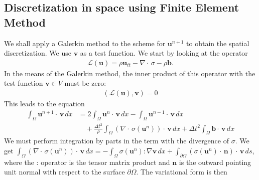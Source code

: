 \documentclass[twoside]{article}
\begin{document}
\subsection{Discretization in space using Finite Element Method}
\label{finiteelements}

We shall apply a Galerkin method to the scheme for \( \mathbf{u}^{n+1}\) to obtain the spatial discretization. We use \( \mathbf{v}\) as a test function. We start by looking at the operator 
\begin{align*}
	\mathcal{L}(\mathbf{u}) = \rho \mathbf{u}_{tt} - \nabla \cdot\, \sigma - \rho \mathbf{b}.
\end{align*}
In the means of the Galerkin method, the inner product of this operator with the test function \( \mathbf{v} \in V\) must be zero:
\begin{align}
	(\mathcal{L}(\mathbf{u}), \mathbf{v}) = 0
\end{align}
This leads to the equation
\begin{align*}
	\int_{\Omega} \mathbf{u}^{n+1} \cdot \, \mathbf{v} \, dx &= 2\int_{\Omega} \mathbf{u}^{n} \cdot \, \mathbf{v} \, dx - \int_{\Omega} \mathbf{u}^{n-1} \cdot \, \mathbf{v} \, dx \\
								  &\quad+ \frac{\Delta t^2}{\rho} \int_{\Omega} (\nabla \cdot \, \sigma(\mathbf{u}^{n})) \cdot \, \mathbf{v} \, dx + \Delta t^2 \int_{\Omega} \mathbf{b} \cdot \, \mathbf{v} \, dx 
\end{align*}
We must perform integration by parts in the term with the divergence of \( \sigma\). We get
\(\int_{\Omega} (\nabla \cdot \, \sigma(\mathbf{u}^{n})) \cdot \, \mathbf{v} \, dx 
	=  - \int_{\Omega} \sigma(\mathbf{u}^n) : \nabla \mathbf{v} \, dx + \int_{\partial \Omega} (\sigma(\mathbf{u}^n) \cdot \,\mathbf{n}) \cdot \, \mathbf{v} \, ds\), where the : operator is the tensor matrix product and \( \mathbf{n}\) is the outward pointing unit normal with respect to the surface \( \partial \Omega\). The variational form is then
\end{document}
